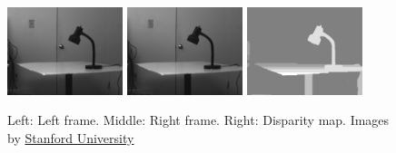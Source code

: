 \documentclass[a4paper]{article}
\begin{document}
\begin{figure}[!ht]
\centering
\includegraphics[width=0.3\textwidth]{images/lamp_left.jpg}
\includegraphics[width=0.3\textwidth]{images/lamp_right.jpg} \includegraphics[width=0.3\textwidth]{images/lamp_disparity.jpg}
\caption[Disparity map]{Left: Left frame. Middle: Right frame. Right: Disparity map. Images by \href{http://vision.stanford.edu/~birch/p2p/}{Stanford University}}
\label{disparitymap}
\end{figure}
\end{document}
